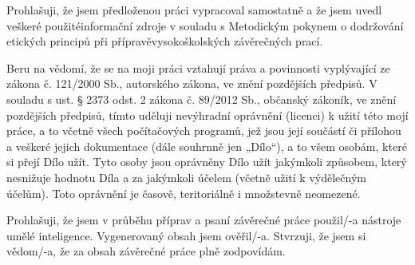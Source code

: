 \documentclass[slovak,master,oneside]{ctufit-thesis}
\begin{document}
\begin{declarationpage}
	Prohlašuji, že jsem předloženou práci vypracoval samostatně a že jsem uvedl veškeré použitéinformační zdroje v souladu s Metodickým pokynem o dodržování etických principů při přípravěvysokoškolských závěrečných prací.

	Beru na vědomí, že se na moji práci vztahují práva a povinnosti vyplývající ze zákona č. 121/2000 Sb., autorského zákona, ve znění pozdějších předpisů. V souladu s ust. § 2373 odst. 2 zákona č. 89/2012 Sb., občanský zákoník, ve znění pozdějších předpisů, tímto uděluji nevýhradní oprávnění (licenci) k užití této mojí práce, a to včetně všech počítačových programů, jež jsou její součástí či přílohou a veškeré jejich dokumentace (dále souhrnně jen „Dílo“), a to všem osobám, které si přejí Dílo užít. Tyto osoby jsou oprávněny Dílo užít jakýmkoli způsobem, který nesnižuje hodnotu Díla a za jakýmkoli účelem (včetně užití k výdělečným účelům). Toto oprávnění je časově, teritoriálně i množstevně neomezené.

	Prohlašuji, že jsem v průběhu příprav a psaní závěrečné práce použil/-a nástroje umělé inteligence. Vygenerovaný obsah jsem ověřil/-a. Stvrzuji, že jsem si vědom/-a, že za obsah závěrečné práce plně zodpovídám.
\end{declarationpage}

\printtwopageabstract
\end{document}
